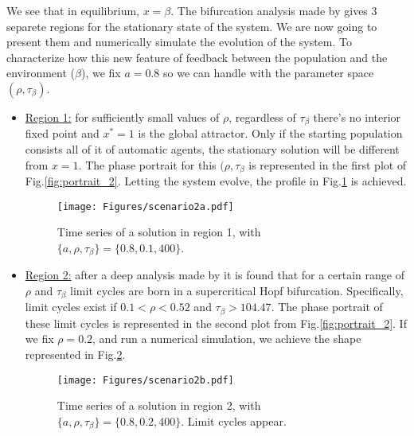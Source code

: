 \documentclass[10pt,a4paper]{article}
\begin{document}
We see that in equilibrium, $x=\beta$. The bifurcation analysis made by \cite{Strogatz:evolutionary} gives 3 separete regions for the stationary state of the 
system. We are now going to present them and numerically simulate the evolution of the system. To characterize how this new feature of feedback between the population
and the environment ($\beta$), we fix $a=0.8$ so we can handle with the parameter space $(\rho,\tau_{\beta})$.

\begin{itemize}
 \item {\underline{Region 1:} for sufficiently small values of $\rho$, regardless of $\tau_{\beta}$ there's no interior fixed point and $x^* = 1$ is the global attractor.
 Only if the starting population consists all of it of automatic agents, the stationary solution will be different from $x=1$. The phase portrait for this $(\rho,\tau_{\beta}$ 
 is represented in the first plot of Fig.\ref{fig:portrait_2}. Letting the system evolve, the profile in Fig.\ref{fig:scenario2a} is achieved.  

\begin{figure}[h!]
\centering
\vspace{-2.0cm}
\texttt{[image: Figures/scenario2a.pdf]}
\vspace{-0.4cm}
\caption{Time series of a solution in region 1, with  $\{a,\rho,\tau_{\beta}\}=\{0.8,0.1,400\}$.}
\label{fig:scenario2a}
\end{figure}
}

 \item {\underline{Region 2:} after a deep analysis made by \cite{Strogatz:evolutionary} it is found that for a certain range of $\rho$ and $\tau_{\beta}$ 
 limit cycles are born in a supercritical Hopf bifurcation. Specifically, limit cycles exist if $0.1<\rho<0.52$ and $\tau_{\beta}>104.47$. The phase portrait of
 these limit cycles is represented in the second plot from Fig.\ref{fig:portrait_2}. If we fix $\rho=0.2$, and run a numerical simulation, we achieve the 
 shape represented in Fig.\ref{fig:scenario2b}.
 
\begin{figure}[h!]
\centering
\vspace{-2.0cm}
\texttt{[image: Figures/scenario2b.pdf]}
\vspace{-0.4cm}
\caption{Time series of a solution in region 2, with  $\{a,\rho,\tau_{\beta}\}=\{0.8,0.2,400\}$. Limit cycles appear.}
\label{fig:scenario2b}
\end{figure}
}


\end{itemize}
\end{document}

